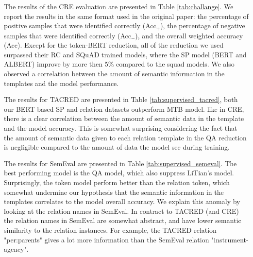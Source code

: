\documentclass[11pt]{article}
\begin{document}
\begin{table}[t!]
\centering
{}
\caption{{\bf SemEval.} Supervised results on the  SemEval datasets. LiTian is the current state of the art. }
\label{tab:supervised_semeval}
\end{table}
The results of the CRE evaluation are presented in Table \ref{tab:challange}. We report the results in the same format used in the original paper: the percentage of positive samples that were identified correctly (Acc$_+$), the percentage of negative samples that were identified correctly (Acc$_-$), and the overall weighted accuracy (Acc). Except for the token-BERT reduction, all of the reduction we used surpassed their RC and SQuAD trained models, where the SP model (BERT and ALBERT) improve by more then 5\% compared to the squad models. We also observed a correlation between the amount of semantic information in the templates and the model performance.

The results for TACRED are presented in  Table \ref{tab:supervised_tacred}, both our BERT based SP and relation datasets outperform MTB model. like in CRE, there is a clear correlation between the amount of semantic data in the template and the model accuracy. This is somewhat surprising considering the fact that the amount of semantic data given to each relation template in the QA reduction is negligible compared to the amount of data the model see during training.

The results for SemEval are presented in Table \ref{tab:supervised_semeval}. The best performing model is the QA model, which also suppress LiTian's model. Surprisingly, the token model perform better than the relation token, which somewhat undermine our hypothesis that the semantic information in the templates correlates to the model overall accuracy. We explain this anomaly by looking at the relation names in SemEval. In contract to TACRED (and CRE) the relation names in SemEval are somewhat abstract, and have lower semantic similarity to the relation instances. For example, the TACRED relation "per:parents" gives a lot more information than the SemEval relation "instrument-agency".
\end{document}
